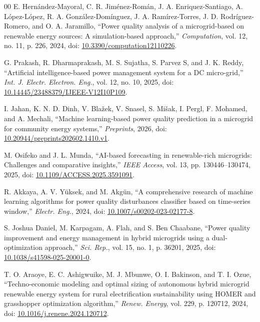\documentclass[conference,a4paper]{IEEEtran}
\begin{document}
\begin{thebibliography}{00}
 E. Hern\'{a}ndez-Mayoral, C. R.
Jim\'{e}nez-Rom\'{a}n, J. A. Enriquez-Santiago, A. L\'{o}pez-L\'{o}pez,
R. A. Gonz\'{a}lez-Dom\'{i}nguez, J. A. Ram\'{i}rez-Torres, J. D.
Rodr\'{i}guez-Romero, and O. A. Jaramillo, ``Power quality analysis of
a microgrid-based on renewable energy sources: A simulation-based
approach,'' \emph{Computation}, vol. 12, no. 11, p. 226, 2024, doi:
\href{https://doi.org/10.3390/computation12110226}{10.3390/computation12110226}.

 G. Prakash, R. Dharmaprakash, M. S.
Sujatha, S. Parvez S, and J. K. Reddy, ``Artificial intelligence-based
power management system for a DC micro-grid,'' \emph{Int. J. Electr.
Electron. Eng.}, vol. 12, no. 10, 2025, doi:
\href{https://doi.org/10.14445/23488379/IJEEE-V12I10P109}{10.14445/23488379/IJEEE-V12I10P109}.

 I. Jahan, K. N. D. Dinh, V. Bla\v{z}ek, V.
Snasel, S. Mi\v{s}ak, I. Pergl, F. Mohamed, and A. Mechali, ``Machine
learning-based power quality prediction in a microgrid for community
energy systems,'' \emph{Preprints}, 2026, doi:
\href{https://doi.org/10.20944/preprints202602.1410.v1}{10.20944/preprints202602.1410.v1}.

 M. Osifeko and J. L. Munda,
``AI-based forecasting in renewable-rich microgrids: Challenges and
comparative insights,'' \emph{IEEE Access}, vol. 13, pp. 130446--130474,
2025, doi: \href{https://doi.org/10.1109/ACCESS.2025.3591091}{10.1109/ACCESS.2025.3591091}.

 R. Akkaya, A. V. Y\"{u}ksek, and M.
Akg\"{u}n, ``A comprehensive research of machine learning algorithms
for power quality disturbances classifier based on time-series
window,'' \emph{Electr. Eng.}, 2024, doi:
\href{https://doi.org/10.1007/s00202-023-02177-8}{10.1007/s00202-023-02177-8}.

 S. Joshua Daniel, M. Karpagam, A. Flah,
and S. Ben Chaabane, ``Power quality improvement and energy management
in hybrid microgrids using a dual-optimization approach,'' \emph{Sci.
Rep.}, vol. 15, no. 1, p. 36201, 2025, doi:
\href{https://doi.org/10.1038/s41598-025-20001-0}{10.1038/s41598-025-20001-0}.

 T. O. Araoye, E. C. Ashigwuike, M. J.
Mbunwe, O. I. Bakinson, and T. I. Ozue, ``Techno-economic modeling and
optimal sizing of autonomous hybrid microgrid renewable energy system
for rural electrification sustainability using HOMER and grasshopper
optimization algorithm,'' \emph{Renew. Energy}, vol. 229, p. 120712,
2024, doi:
\href{https://doi.org/10.1016/j.renene.2024.120712}{10.1016/j.renene.2024.120712}.


\end{thebibliography}
\end{document}
